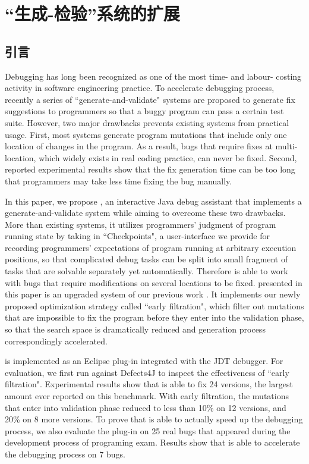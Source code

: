 \chapter{“生成-检验”系统的扩展}
\label{cha:ext}

\section{引言}%
Debugging has long been recognized as one of the most time- and labour- costing activity in software engineering practice. To accelerate debugging process, recently a series of ``generate-and-validate" systems are proposed to generate fix suggestions to programmers so that a buggy program can pass a certain test suite.
However, two major drawbacks prevents existing systems from practical usage. First, most systems generate program mutations that include only one location of changes in the program. As a result, bugs that require fixes at multi-location, which widely exists in real coding practice, can never be fixed. Second, reported experimental results show that the fix generation time can be too long that programmers may take less time fixing the bug manually.

In this paper, we propose \SmartDebug, an interactive Java debug assistant that implements a generate-and-validate system while aiming to overcome these two drawbacks. More than existing systems, it utilizes programmers' judgment of program running state by taking in ``Checkpoints", a user-interface we provide for recording programmers' expectations of program running at arbitrary execution positions, so that complicated debug tasks can be split into small fragment of tasks that are solvable separately yet automatically. Therefore \SmartDebug is able to work with bugs that require modifications on several locations to be fixed. \SmartDebug presented in this paper is an upgraded system of our previous work \cite{Guo:2016:SID:2950290.2983971}. It implements our newly proposed optimization strategy called ``early filtration", which filter out mutations that are impossible to fix the program before they enter into the validation phase, so that the search space is dramatically reduced and generation process correspondingly accelerated.

\SmartDebug is implemented as an Eclipse plug-in integrated with the JDT debugger. For evaluation, we first run \SmartDebug against Defects4J to inspect the effectiveness of ``early filtration". Experimental results show that \SmartDebug is able to fix 24 versions, the largest amount ever reported on this benchmark. With early filtration, the mutations that enter into validation phase reduced to less than 10\% on 12 versions, and 20\% on 8 more versions. To prove that \SmartDebug is able to actually speed up the debugging process, we also evaluate the plug-in on 25 real bugs that appeared during the development process of programing exam. Results show that \SmartDebug is able to accelerate the debugging process on 7 bugs.

